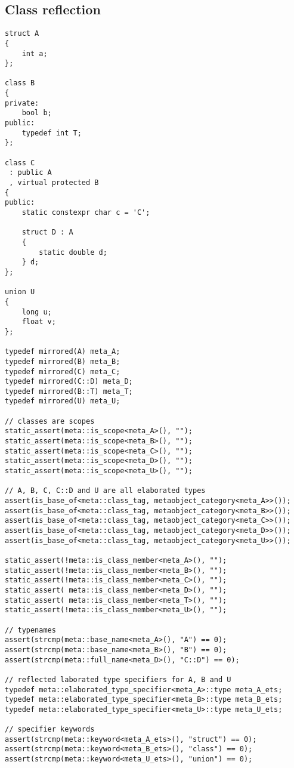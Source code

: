 \subsection{Class reflection}

\begin{verbatim}
struct A
{
	int a;
};

class B
{
private:
	bool b;
public:
	typedef int T;
};

class C
 : public A
 , virtual protected B
{
public:
	static constexpr char c = 'C';

	struct D : A
	{
		static double d;
	} d;
};

union U
{
	long u;
	float v;
};

typedef mirrored(A) meta_A;
typedef mirrored(B) meta_B;
typedef mirrored(C) meta_C;
typedef mirrored(C::D) meta_D;
typedef mirrored(B::T) meta_T;
typedef mirrored(U) meta_U;

// classes are scopes
static_assert(meta::is_scope<meta_A>(), "");
static_assert(meta::is_scope<meta_B>(), "");
static_assert(meta::is_scope<meta_C>(), "");
static_assert(meta::is_scope<meta_D>(), "");
static_assert(meta::is_scope<meta_U>(), "");

// A, B, C, C::D and U are all elaborated types
assert(is_base_of<meta::class_tag, metaobject_category<meta_A>>());
assert(is_base_of<meta::class_tag, metaobject_category<meta_B>>());
assert(is_base_of<meta::class_tag, metaobject_category<meta_C>>());
assert(is_base_of<meta::class_tag, metaobject_category<meta_D>>());
assert(is_base_of<meta::class_tag, metaobject_category<meta_U>>());

static_assert(!meta::is_class_member<meta_A>(), "");
static_assert(!meta::is_class_member<meta_B>(), "");
static_assert(!meta::is_class_member<meta_C>(), "");
static_assert( meta::is_class_member<meta_D>(), "");
static_assert( meta::is_class_member<meta_T>(), "");
static_assert(!meta::is_class_member<meta_U>(), "");

// typenames
assert(strcmp(meta::base_name<meta_A>(), "A") == 0);
assert(strcmp(meta::base_name<meta_B>(), "B") == 0);
assert(strcmp(meta::full_name<meta_D>(), "C::D") == 0);

// reflected laborated type specifiers for A, B and U
typedef meta::elaborated_type_specifier<meta_A>::type meta_A_ets;
typedef meta::elaborated_type_specifier<meta_B>::type meta_B_ets;
typedef meta::elaborated_type_specifier<meta_U>::type meta_U_ets;

// specifier keywords
assert(strcmp(meta::keyword<meta_A_ets>(), "struct") == 0);
assert(strcmp(meta::keyword<meta_B_ets>(), "class") == 0);
assert(strcmp(meta::keyword<meta_U_ets>(), "union") == 0);


\end{verbatim}
